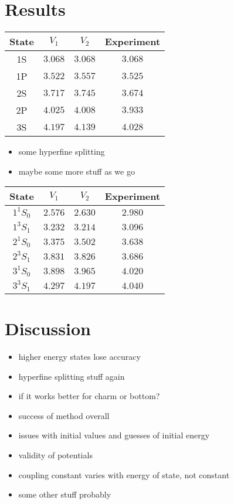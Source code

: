 \documentclass[10pt, twocolumn]{article}
\begin{document}
\section{Results}
\begin{center}
    \begin{tabular}{|c|c|c|c|}
        \hline 
        \rowcolor{lightgray} State & $V_1$ & $V_2$ & Experiment \\
        \hline
        1S & $3.068$ & $3.068$ & $3.068$ \\
        \hline
        1P & $3.522$ & $3.557$ & $3.525$ \\
        \hline
        2S & $3.717$ & $3.745$ & $3.674$ \\
        \hline
        2P & $4.025$ & $4.008$ & $3.933$ \\
        \hline
        3S & $4.197$ & $4.139$ & $4.028$ \\
        \hline
    \end{tabular}
\end{center}
\begin{itemize}
    \item some hyperfine splitting
    \item maybe some more stuff as we go
\end{itemize}
\begin{center}
    \begin{tabular}{|c|c|c|c|}
        \hline
        \rowcolor{lightgray} State & $V_1$ & $V_2$ & Experiment \\
        \hline
        $1^1S_0$ & $2.576$ & $2.630$ & $2.980$ \\
        \hline
        $1^3S_1$ & $3.232$ & $3.214$ & $3.096$ \\
        \hline
        $2^1S_0$ & $3.375$ & $3.502$ & $3.638$ \\
        \hline
        $2^3S_1$ & $3.831$ & $3.826$ & $3.686$ \\
        \hline
        $3^1S_0$ & $3.898$ & $3.965$ & $4.020$ \\
        \hline
        $3^3S_1$ & $4.297$ & $4.197$ & $4.040$ \\
        \hline
    \end{tabular}
\end{center}

\section{Discussion}
\begin{itemize}
    \item higher energy states lose accuracy
    \item hyperfine splitting stuff again
    \item if it works better for charm or bottom?
    \item success of method overall
    \item issues with initial values and guesses of initial energy
    \item validity of potentials
    \item coupling constant varies with energy of state, not constant
    \item some other stuff probably
\end{itemize}
\end{document}
